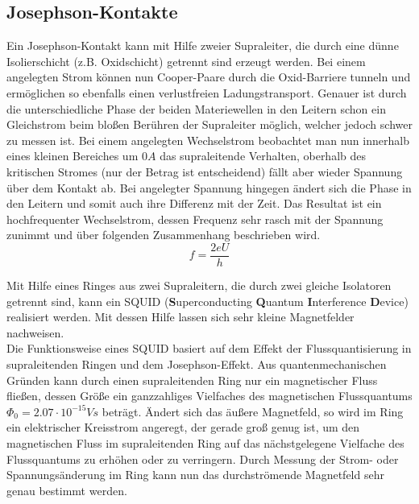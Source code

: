 
	\subsection{Josephson-Kontakte} %
	\label{sub:josephson_kontakte}
	
		Ein Josephson-Kontakt kann mit Hilfe zweier Supraleiter, die durch eine dünne Isolierschicht (z.B. Oxidschicht) getrennt sind erzeugt werden.
		Bei einem angelegten Strom können nun Cooper-Paare durch die Oxid-Barriere tunneln und ermöglichen so ebenfalls einen verlustfreien Ladungstransport. 
		Genauer ist durch die unterschiedliche Phase der beiden Materiewellen in den Leitern schon ein Gleichstrom beim bloßen Berühren der Supraleiter möglich, welcher jedoch schwer zu messen ist.
		Bei einem angelegten Wechselstrom beobachtet man nun innerhalb eines kleinen Bereiches um $0\unit{A}$ das supraleitende Verhalten, oberhalb des kritischen Stromes (nur der Betrag ist entscheidend) fällt aber wieder Spannung über dem Kontakt ab.
		Bei angelegter Spannung hingegen ändert sich die Phase in den Leitern und somit auch ihre Differenz mit der Zeit. 
		Das Resultat ist ein hochfrequenter Wechselstrom, dessen Frequenz sehr rasch mit der Spannung zunimmt und über folgenden Zusammenhang beschrieben wird.
		\[ f = \dfrac{2eU}{h} \] \par
		Mit Hilfe eines Ringes aus zwei Supraleitern, die durch zwei gleiche Isolatoren getrennt sind, kann ein SQUID (\textbf{S}uperconducting \textbf{Q}uantum \textbf{I}nterference \textbf{D}evice) realisiert werden.
		Mit dessen Hilfe lassen sich sehr kleine Magnetfelder nachweisen.\\
		Die Funktionsweise eines SQUID basiert auf dem Effekt der Flussquantisierung in supraleitenden Ringen und dem Josephson-Effekt. 
		Aus quantenmechanischen Gründen kann durch einen supraleitenden Ring nur ein magnetischer Fluss fließen, dessen Größe ein ganzzahliges Vielfaches des magnetischen Flussquantums $\Phi_0 = 2.07\cdot 10^{-15}\unit{Vs}$ beträgt. 
		Ändert sich das äußere Magnetfeld, so wird im Ring ein elektrischer Kreisstrom angeregt, der gerade groß genug ist, um den magnetischen Fluss im supraleitenden Ring auf das nächstgelegene Vielfache des Flussquantums zu erhöhen oder zu verringern.
		Durch Messung der Strom- oder Spannungsänderung im Ring kann nun das durchströmende Magnetfeld sehr genau bestimmt werden.


